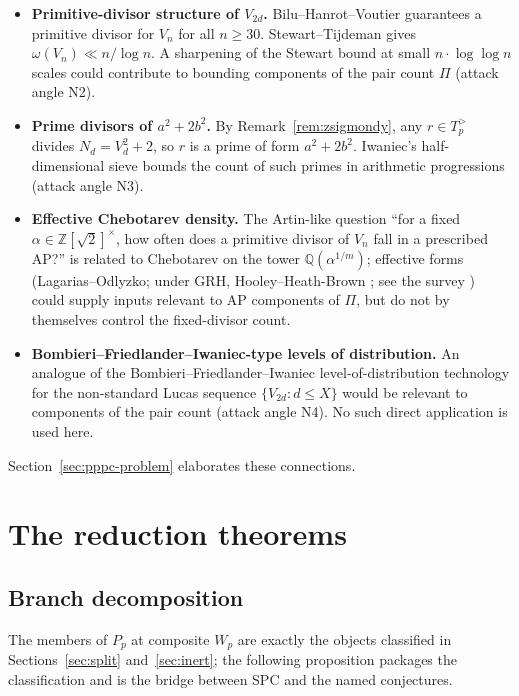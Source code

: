 \documentclass[11pt]{amsart}
\theoremstyle{plain}
\theoremstyle{definition}
\theoremstyle{remark}
\numberwithin{equation}{section}
\newcommand{\Z}{\mathbb{Z}}
\newcommand{\Q}{\mathbb{Q}}
\begin{document}
\begin{itemize}
\item \textbf{Primitive-divisor structure of $V_{2 d}$.} Bilu--Hanrot--Voutier \cite{ref:BHV} guarantees a primitive divisor for $V_n$ for all $n \geq 30$. Stewart--Tijdeman \cite{ref:Stewart} gives $\omega(V_n) \ll n / \log n$. A sharpening of the Stewart bound at small $n \cdot \log \log n$ scales could contribute to bounding components of the pair count $\Pi$ (attack angle N2).

\item \textbf{Prime divisors of $a^2 + 2 b^2$.} By Remark~\ref{rem:zsigmondy}, any $r \in T_p^{>}$ divides $N_d = V_d^2 + 2$, so $r$ is a prime of form $a^2 + 2 b^2$. Iwaniec's half-dimensional sieve \cite{ref:Iwaniec} bounds the count of such primes in arithmetic progressions (attack angle N3).

\item \textbf{Effective Chebotarev density.} The Artin-like question ``for a fixed $\alpha \in \Z[\sqrt 2]^\times$, how often does a primitive divisor of $V_n$ fall in a prescribed AP?'' is related to Chebotarev on the tower $\Q(\alpha^{1/m})$; effective forms (Lagarias--Odlyzko; under GRH, Hooley--Heath-Brown \cite{ref:Hooley, ref:HeathBrown}; see the survey \cite{ref:Moree}) could supply inputs relevant to AP components of $\Pi$, but do not by themselves control the fixed-divisor count.

\item \textbf{Bombieri--Friedlander--Iwaniec-type levels of distribution.} An analogue of the Bombieri--Friedlander--Iwaniec level-of-distribution technology for the non-standard Lucas sequence $\{V_{2 d} : d \leq X\}$ would be relevant to components of the pair count (attack angle N4). No such direct application is used here.
\end{itemize}

Section~\ref{sec:pppc-problem} elaborates these connections.

\section{The reduction theorems}\label{sec:reduction}

\subsection{Branch decomposition}

The members of $P_p$ at composite $W_p$ are exactly the objects
classified in Sections~\ref{sec:split} and~\ref{sec:inert}; the
following proposition packages the classification and is the bridge
between SPC and the named conjectures.
\end{document}
